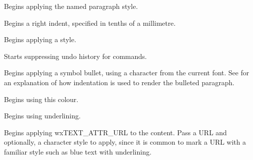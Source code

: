 Begins applying the named paragraph style.

\label{wxrichtextctrlbeginrightindent}


Begins a right indent, specified in tenths of a millimetre.

\label{wxrichtextctrlbeginstyle}


Begins applying a style.

\label{wxrichtextctrlbeginsuppressundo}


Starts suppressing undo history for commands.

\label{wxrichtextctrlbeginsymbolbullet}


Begins applying a symbol bullet, using a character from the current font. See  for
an explanation of how indentation is used to render the bulleted paragraph.

\label{wxrichtextctrlbegintextcolour}


Begins using this colour.

\label{wxrichtextctrlbeginunderline}


Begins using underlining.

\label{wxrichtextctrlbeginurl}


Begins applying wxTEXT\_ATTR\_URL to the content. Pass a URL and optionally, a character style to apply,
since it is common to mark a URL with a familiar style such as blue text with underlining.

